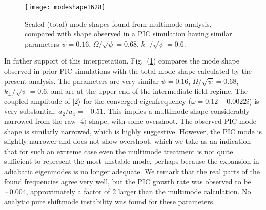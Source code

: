 \documentclass[12pt]{article}
\def\ket#1{|#1\rangle}
\begin{document}
\begin{figure}
  \center  \texttt{[image: modeshape1628]}
  \caption{Scaled (total) mode shapes found from multimode analysis,
    compared with shape observed in a PIC simulation having similar
    parameters $\psi=0.16$, $\Omega/\sqrt{\psi}=0.68$,
$k_\perp/\sqrt{\psi}=0.6$.\label{piccomp}}
\end{figure}
In futher support of this interpretation, Fig.\ (\ref{piccomp})
compares the mode shape observed in prior PIC
simulations\cite{Hutchinson2019} with the total mode shape calculated
by the present analysis. The parameters are very similar $\psi=0.16$,
$\Omega/\sqrt{\psi}=0.68$, $k_\perp/\sqrt{\psi}=0.6$, and are at the
upper end of the intermediate field regime. The coupled amplitude of
$\ket{2}$ for the converged eigenfrequency ($\omega=0.12+0.0022i$) is
very substantial: $a_2/a_4=-0.51$. This implies a multimode shape
considerably narrowed from the raw $\ket{4}$ shape, with some
overshoot. The observed PIC mode shape is similarly narrowed, which is
highly suggestive. However, the PIC mode is slightly narrower and does
not show overshoot, which we take as an indication that for such an
extreme case even the multimode treatment is not quite sufficient to
represent the most unstable mode, perhaps because the expansion in
adiabatic eigenmodes is no longer adequate. We remark that the real
parts of the found frequencies agree very well, but the PIC growth
rate was observed to be $\sim 0.004$, approximately a factor of 2
larger than the multimode calculation. No analytic pure shiftmode
instability was found for these parameters.
\end{document}
